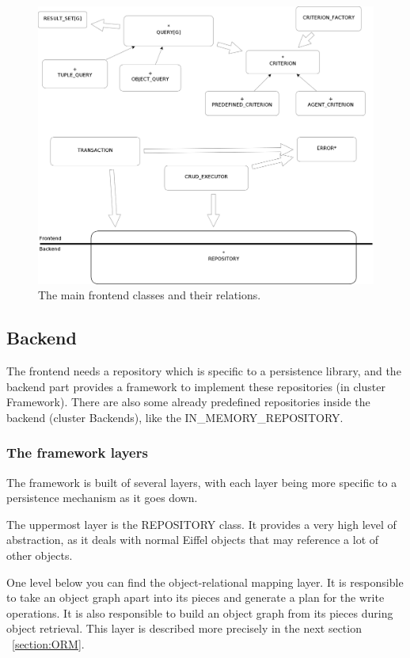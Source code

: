 \begin{figure} [h]
\centering
\includegraphics[trim= 0mm -10mm 0mm -10mm,clip, width = 13cm] {frontend.png}
\caption{The main frontend classes and their relations.}
\label{fig:frontend_classes}
\end{figure}


\subsection{Backend}

The frontend needs a repository which is specific to a persistence library, and the backend part provides a framework to implement these repositories (in cluster Framework).
There are also some already predefined repositories inside the backend (cluster Backends), like the IN\_MEMORY\_REPOSITORY.

\subsubsection{The framework layers}

The framework is built of several layers, with each layer being more specific to a persistence mechanism as it goes down.

The uppermost layer is the REPOSITORY class. 
It provides a very high level of abstraction, as it deals with normal Eiffel objects that may reference a lot of other objects.

One level below you can find the object-relational mapping layer.
It is responsible to take an object graph apart into its pieces and generate a plan for the write operations.
It is also responsible to build an object graph from its pieces during object retrieval.
This layer is described more precisely in the next section ~\ref{section:ORM}.

